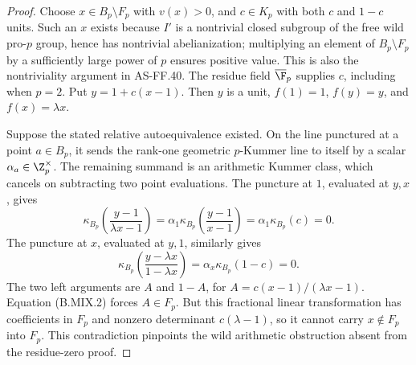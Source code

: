 \begin{proof}
Choose \(x\in B_p\setminus F_p\) with \(v(x)>0\), and
\(c\in K_p\) with both \(c\) and \(1-c\) units. Such an
\(x\) exists because \(I'\) is a nontrivial closed subgroup
of the free wild pro-\(p\) group, hence has nontrivial
abelianization; multiplying an element of \(B_p\setminus F_p\)
by a sufficiently large power of \(p\) ensures positive value.
This is also the nontriviality argument in AS-FF.40. The residue
field \(\overline\F_p\) supplies \(c\), including when \(p=2\).
Put \(y=1+c(x-1)\). Then \(y\) is a unit,
\(f(1)=1\), \(f(y)=y\), and \(f(x)=\lambda x\).

Suppose the stated relative autoequivalence existed. On the line
punctured at a point \(a\in B_p\), it sends the rank-one geometric
\(p\)-Kummer line to itself by a scalar
\(\alpha_a\in\Z_p^\times\). The remaining summand is an
arithmetic Kummer class, which cancels on subtracting two point
evaluations. The puncture at \(1\), evaluated at \(y,x\), gives
\[
 \kappa_{B_p}\!\left(\frac{y-1}{\lambda x-1}\right)
     =\alpha_1\kappa_{B_p}\!\left(\frac{y-1}{x-1}\right)
     =\alpha_1\kappa_{B_p}(c)=0.
\]
The puncture at \(x\), evaluated at \(y,1\), similarly gives
\[
 \kappa_{B_p}\!\left(\frac{y-\lambda x}{1-\lambda x}\right)
     =\alpha_x\kappa_{B_p}(1-c)=0.
\]
The two left arguments are \(A\) and \(1-A\), for
\(A=c(x-1)/(\lambda x-1)\). Equation (B.MIX.2) forces
\(A\in F_p\). But this fractional linear transformation has
coefficients in \(F_p\) and nonzero determinant
\(c(\lambda-1)\), so it cannot carry
\(x\notin F_p\) into \(F_p\). This contradiction pinpoints the
wild arithmetic obstruction absent from the residue-zero proof.
\end{proof}


